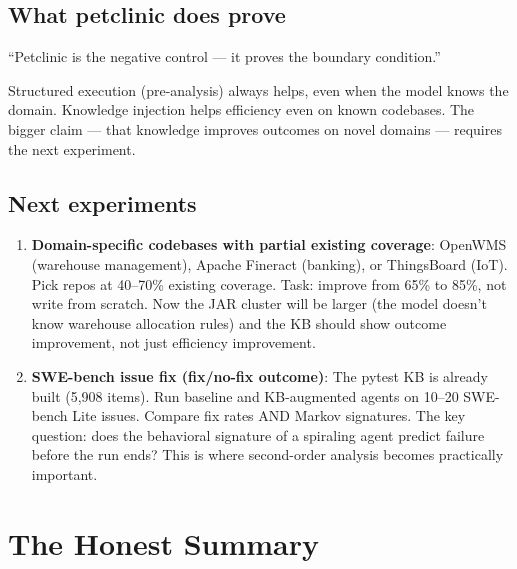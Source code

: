 \documentclass[11pt,a4paper]{article}
\begin{document}
\subsection*{What petclinic does prove}

``Petclinic is the negative control --- it proves the boundary condition.''

Structured execution (pre-analysis) always helps, even when the model knows the domain.
Knowledge injection helps efficiency even on known codebases.
The bigger claim --- that knowledge improves outcomes on novel domains ---
requires the next experiment.

\subsection*{Next experiments}

\begin{enumerate}
  \item \textbf{Domain-specific codebases with partial existing coverage}:
    OpenWMS (warehouse management), Apache Fineract (banking), or ThingsBoard (IoT).
    Pick repos at 40--70\% existing coverage.
    Task: improve from 65\% to 85\%, not write from scratch.
    Now the JAR cluster will be larger (the model doesn't know warehouse allocation rules)
    and the KB should show outcome improvement, not just efficiency improvement.

  \item \textbf{SWE-bench issue fix (fix/no-fix outcome)}:
    The pytest KB is already built (5,908 items).
    Run baseline and KB-augmented agents on 10--20 SWE-bench Lite issues.
    Compare fix rates AND Markov signatures.
    The key question: does the behavioral signature of a spiraling agent
    predict failure before the run ends?
    This is where second-order analysis becomes practically important.
\end{enumerate}

\section{The Honest Summary}
\end{document}
